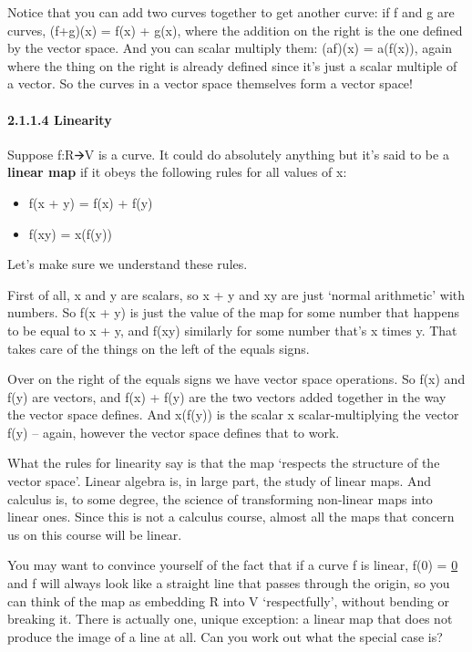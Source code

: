 \documentclass[oneside,english]{amsbook}
\numberwithin{section}{chapter}
\theoremstyle{plain}
\theoremstyle{definition}
\begin{document}
Notice that you can add two curves together to get another curve: if f
and g are curves, (f+g)(x) = f(x) + g(x), where the addition on the
right is the one defined by the vector space. And you can scalar
multiply them: (af)(x) = a(f(x)), again where the thing on the right is
already defined since it's just a scalar multiple of a vector. So the
curves in a vector space themselves form a vector space!

\paragraph{2.1.1.4 Linearity}\label{linearity}

Suppose f:R🡪V is a curve. It could do absolutely anything but it's said
to be a \textbf{linear map} if it obeys the following rules for all
values of x:

\begin{itemize}
	\item
	f(x + y) = f(x) + f(y)
	\item
	f(xy) = x(f(y))
\end{itemize}

Let's make sure we understand these rules.

First of all, x and y are scalars, so x + y and xy are just `normal
arithmetic' with numbers. So f(x + y) is just the value of the map for
some number that happens to be equal to x + y, and f(xy) similarly for
some number that's x times y. That takes care of the things on the left
of the equals signs.

Over on the right of the equals signs we have vector space operations.
So f(x) and f(y) are vectors, and f(x) + f(y) are the two vectors added
together in the way the vector space defines. And x(f(y)) is the scalar
x scalar-multiplying the vector f(y) -- again, however the vector space
defines that to work.

What the rules for linearity say is that the map `respects the
structure of the vector space'. Linear algebra is, in large part, the
study of linear maps. And calculus is, to some degree, the science of
transforming non-linear maps into linear ones. Since this is not a
calculus course, almost all the maps that concern us on this course will
be linear.

You may want to convince yourself of the fact that if a curve f is
linear, f(0) = \ul{0} and f will always look like a straight line that
passes through the origin, so you can think of the map as embedding R
into V `respectfully', without bending or breaking it. There is
actually one, unique exception: a linear map that does not produce the
image of a line at all. Can you work out what the special case is?
\end{document}
